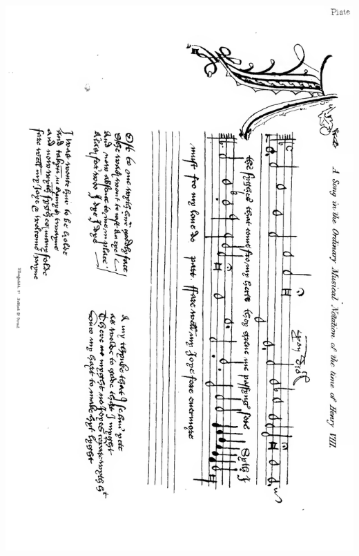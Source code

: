 
 
\thispagestyle{empty}
\noindent\includegraphics*[width=\textwidth]{images/Plate2X.pdf}
\pagebreak
 
